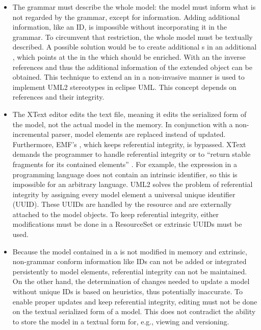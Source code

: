 \begin{itemize}
	\item The grammar must describe the whole model: the model must inform what is not regarded by the grammar, except for  information. Adding additional information, like an ID, is impossible without incorporating it in the grammar. To circumvent that restriction, the whole model must be textually described. A possible solution would be to create additional s in an additional , which points at the  in the  which should be enriched. With an  the inverse references and thus the additional information of the extended object can be obtained. This technique to extend an  in a non-invasive manner is used to implement UML2 stereotypes in eclipse UML. This concept depends on references and their integrity.
	\item The XText editor edits the text file, meaning it edits the serialized form of the model, not the actual model in the memory. In conjunction with a non-incremental parser, model elements are replaced instead of updated. Furthermore, EMF's , which keeps referential integrity, is bypassed. XText demands the programmer to handle referential integrity or to ``return stable fragments for its contained elements'' \cite{XTextMan}. For example, the expression  in a programming language does not contain an intrinsic identifier, so this is impossible for an arbitrary language. UML2 solves the problem of referential integrity by assigning every model element a universal unique identifier (UUID). These UUIDs are handled by the resource and are  externally attached to the model objects. To keep referential integrity, either modifications must be done in a ResourceSet or extrinsic UUIDs must be used. 
	\item Because the model contained in a  is not modified in memory and extrinsic, non-grammar conform information like IDs can not be added or integrated persistently to model elements, referential integrity can not be maintained. On the other hand, the determination of changes needed to update a model without unique IDs is based on heuristics, thus potentially inaccurate.  To enable proper updates and keep referential integrity, editing must not be done on the textual serialized form of a model. This does not contradict the ability to store the model in a textual form for, e.g., viewing and versioning. 
\end{itemize}

